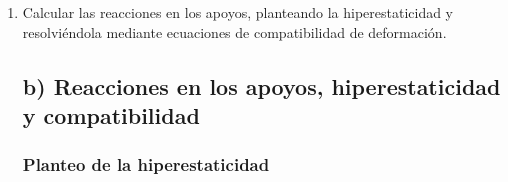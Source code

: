 \documentclass[12pt,a4paper]{article}
\begin{document}
\begin{enumerate}
\begin{figure}[H]
\caption{Diagrama de cuerpo libre del eje hiperestático de grado 1.}
\label{fig:dcl_ej2}
\end{figure}

El eje se encuentra empotrado en ambos extremos, por lo que aparecen dos reacciones torsores desconocidas, $T_A$ y $T_C$. En la sección intermedia B actúa el momento torsor externo $M_B$, que se redistribuye entre los apoyos en función de la rigidez torsional de cada tramo.
\subsubsection*{Interpretación física}

El sistema es torsionalmente indeterminado porque el par aplicado en B debe ser equilibrado por ambos apoyos, y el reparto entre ellos depende de la rigidez torsional de cada tramo.

\item[b)] Calcular las reacciones en los apoyos, planteando la hiperestaticidad y resolviéndola mediante ecuaciones de compatibilidad de deformación.

\subsection*{b) Reacciones en los apoyos, hiperestaticidad y compatibilidad}

\subsubsection*{Planteo de la hiperestaticidad}


\end{enumerate}
\end{document}
